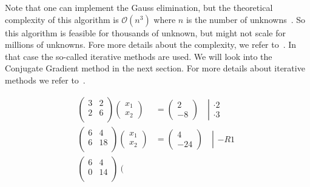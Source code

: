Note that one can implement the Gauss elimination, but the theoretical complexity of this algorithm is $\mathcal{O}(n^3)$ where $n$ is the number of unknowns~\cite{farebrother1988linear}. So this algorithm is feasible for thousands of unknown, but might not scale for millions of unknowns. Fore more details about the complexity, we refer to~\cite{fang1997worst}. In that case the so-called iterative methods are used. We will look into the Conjugate Gradient method in the next section. For more details about iterative methods we refer to~\cite{olshanskii2014iterative,briggs2000multigrid}.


\begin{align}
\left(\begin{matrix}
3 & 2 \\
2 & 6 \\
\end{matrix}\right)
\left(\begin{matrix}
x_1 \\
x_2
\end{matrix}\right)
&=\left(
\begin{matrix}
2 \\
-8
\end{matrix}\right)
\quad \left|\begin{matrix}
\cdot 2 \\
\cdot 3
\end{matrix}\right. \label{eq:gauss:1}\\
\left(\begin{matrix}
6 & 4 \\
6 & 18 \\
\end{matrix}\right)
\left(\begin{matrix}
x_1 \\
x_2
\end{matrix}\right)
&=\left(
\begin{matrix}
4 \\
-24
\end{matrix}\right)
\quad\left|\begin{matrix}
 \\
- R1 \\
\end{matrix}\right. \label{eq:gauss:2} \\
\left(\begin{matrix}
6 & 4 \\
0 & 14 \\
\end{matrix}\right)
\left(\begin{matrix}

\end{matrix}
\end{align}
